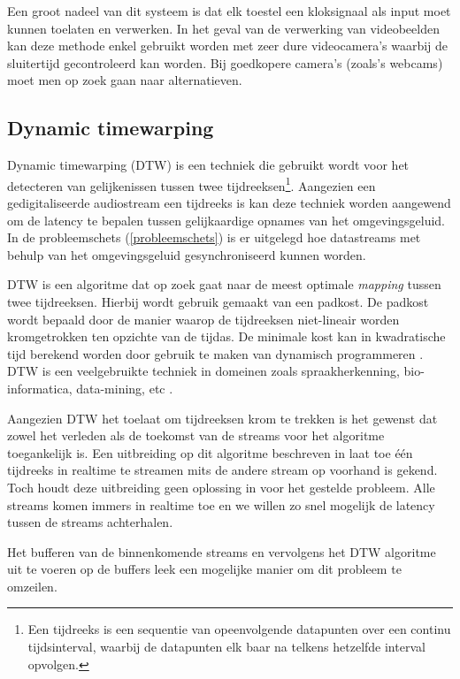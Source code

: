 Een groot nadeel van dit systeem is dat elk toestel een kloksignaal als input moet kunnen toelaten en verwerken. In het geval van de verwerking van videobeelden kan deze methode enkel gebruikt worden met zeer dure videocamera's waarbij de sluitertijd gecontroleerd kan worden. Bij goedkopere camera's (zoals's webcams) moet men op zoek gaan naar alternatieven. \cite{six2015multimodal}



\subsection{Dynamic timewarping}

Dynamic timewarping (DTW) is een techniek die gebruikt wordt voor het detecteren van gelijkenissen tussen twee tijdreeksen\footnote{Een tijdreeks is een sequentie van opeenvolgende datapunten over een continu tijdsinterval, waarbij de datapunten elk baar na telkens hetzelfde interval opvolgen.}. Aangezien een gedigitaliseerde audiostream een tijdreeks is kan deze techniek worden aangewend om de latency te bepalen tussen gelijkaardige opnames van het omgevingsgeluid. In de probleemschets (\ref{probleemschets}) is er uitgelegd hoe datastreams met behulp van het omgevingsgeluid gesynchroniseerd kunnen worden.

DTW is een algoritme dat op zoek gaat naar de meest optimale \textit{mapping} tussen twee tijdreeksen. Hierbij wordt gebruik gemaakt van een padkost. De padkost wordt bepaald door de manier waarop de tijdreeksen niet-lineair worden kromgetrokken ten opzichte van de tijdas\cite{salvador2007toward}. De minimale kost kan in kwadratische tijd berekend worden door gebruik te maken van dynamisch programmeren \cite{dixon2005live}. DTW is een veelgebruikte techniek in domeinen zoals spraakherkenning, bio-informatica, data-mining, etc \cite{ratanamahatana2004everything}.

Aangezien DTW het toelaat om tijdreeksen krom te trekken is het gewenst dat zowel het verleden als de toekomst van de streams voor het algoritme toegankelijk is. Een uitbreiding op dit algoritme beschreven in \cite{dixon2005live} laat toe één tijdreeks in realtime te streamen mits de andere stream op voorhand is gekend. Toch houdt deze uitbreiding geen oplossing in voor het gestelde probleem. Alle streams komen immers in realtime toe en we willen zo snel mogelijk de latency tussen de streams achterhalen.

Het bufferen van de binnenkomende streams en vervolgens het DTW algoritme uit te voeren op de buffers leek een mogelijke manier om dit probleem te omzeilen.

